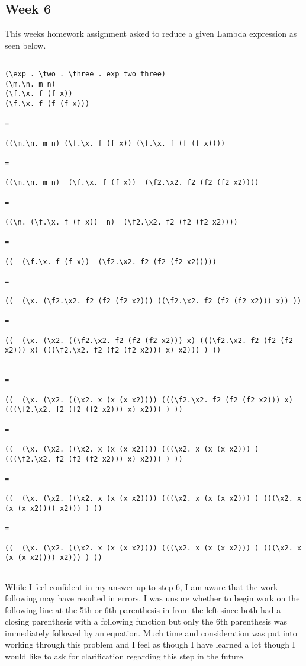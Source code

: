 \documentclass{article}
\theoremstyle{theorem}
\theoremstyle{definition}
\theoremstyle{remark}
\begin{document}
\subsection{Week 6}
This weeks homework assignment asked to reduce a given Lambda expression as seen below.

\begin{lstlisting}

(\exp . \two . \three . exp two three)
(\m.\n. m n)
(\f.\x. f (f x))
(\f.\x. f (f (f x)))

=

((\m.\n. m n) (\f.\x. f (f x)) (\f.\x. f (f (f x))))

=

((\m.\n. m n)  (\f.\x. f (f x))  (\f2.\x2. f2 (f2 (f2 x2))))

=

((\n. (\f.\x. f (f x))  n)  (\f2.\x2. f2 (f2 (f2 x2))))

=

((  (\f.\x. f (f x))  (\f2.\x2. f2 (f2 (f2 x2)))))

=

((  (\x. (\f2.\x2. f2 (f2 (f2 x2))) ((\f2.\x2. f2 (f2 (f2 x2))) x)) ))

=

((  (\x. (\x2. ((\f2.\x2. f2 (f2 (f2 x2))) x) (((\f2.\x2. f2 (f2 (f2 x2))) x) (((\f2.\x2. f2 (f2 (f2 x2))) x) x2))) ) ))


=

((  (\x. (\x2. ((\x2. x (x (x x2)))) (((\f2.\x2. f2 (f2 (f2 x2))) x) (((\f2.\x2. f2 (f2 (f2 x2))) x) x2))) ) ))

=

((  (\x. (\x2. ((\x2. x (x (x x2)))) (((\x2. x (x (x x2))) ) (((\f2.\x2. f2 (f2 (f2 x2))) x) x2))) ) ))

=

((  (\x. (\x2. ((\x2. x (x (x x2)))) (((\x2. x (x (x x2))) ) (((\x2. x (x (x x2)))) x2))) ) ))

=

((  (\x. (\x2. ((\x2. x (x (x x2)))) (((\x2. x (x (x x2))) ) (((\x2. x (x (x x2)))) x2))) ) ))


\end{lstlisting}
\medskip\noindent

While I feel confident in my answer up to step 6, I am aware that the work following may have resulted in errors. I was unsure whether to begin work on the following line at the 5th or 6th parenthesis in from the left since both had a closing parenthesis with a following function but only the 6th parenthesis was immediately followed by an equation. Much time and consideration was put into working through this problem and I feel as though I have learned a lot though I would like to ask for clarification regarding this step in the future.
\end{document}

